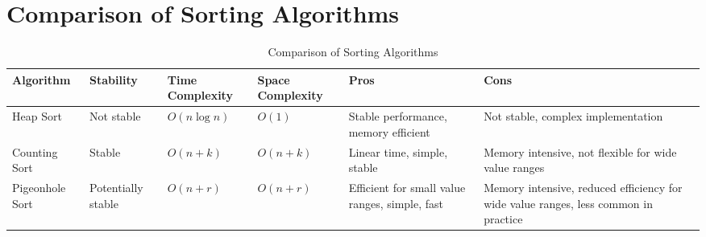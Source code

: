 \section{Comparison of Sorting Algorithms}

\begin{table}[H]
    \centering
    \renewcommand{\arraystretch}{1.2} %
    \setlength{\tabcolsep}{4pt} %
    \footnotesize 
    \begin{tabularx}{\textwidth}{|>{\centering\arraybackslash}X|>{\centering\arraybackslash}X|>{\centering\arraybackslash}X|>{\centering\arraybackslash}X|>{\centering\arraybackslash}X|>{\centering\arraybackslash}X|}
        \hline
        \textbf{Algorithm} & \textbf{Stability} & \textbf{Time Complexity} & \textbf{Space Complexity} & \textbf{Pros} & \textbf{Cons} \\ \hline
        Heap Sort          & Not stable         & $O(n \log n)$            & $O(1)$                    & Stable performance, memory efficient & Not stable, complex implementation \\ \hline
        Counting Sort      & Stable             & $O(n + k)$               & $O(n + k)$                & Linear time, simple, stable           & Memory intensive, not flexible for wide value ranges \\ \hline
        Pigeonhole Sort    & Potentially stable & $O(n + r)$               & $O(n + r)$                & Efficient for small value ranges, simple, fast & Memory intensive, reduced efficiency for wide value ranges, less common in practice \\ \hline
    \end{tabularx}
    \caption{Comparison of Sorting Algorithms}
    \label{tab:sorting_algorithms}
\end{table}
